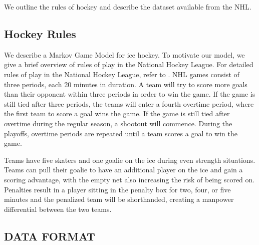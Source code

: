 \documentclass[]{article}
\begin{document}
We outline the rules of hockey and describe the dataset available from the NHL. 

\subsection{Hockey Rules}
We describe a Markov Game Model for ice hockey. To motivate our model, we give a brief overview of rules of play in the National Hockey League. For detailed rules of play in the National Hockey League, refer to \citep{NHLRulebook2014}. NHL games consist of three periods, each 20 minutes in duration. A team will try to score more goals than their opponent within three periods in order to win the game. If the game is still tied after three periods, the teams will enter a fourth overtime period, where the first team to score a goal wins the game. If the game is still tied after overtime during the regular season, a shootout will commence. During the playoffs, overtime periods are repeated until a team scores a goal to win the game.

Teams have five skaters and one goalie on the ice during even strength situations. Teams can pull their goalie to have an additional player on the ice and gain a scoring advantage, with the empty net also increasing the risk of being scored on. Penalties result in a player sitting in the penalty box for two, four, or five minutes and the penalized team will be shorthanded, creating a manpower differential between the two teams.

\subsection{DATA FORMAT}
\end{document}
